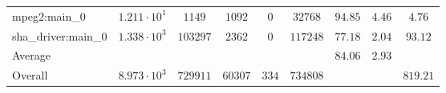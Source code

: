 \begin{tabular}{|l|c|c|c|c|c|c|c|c|}
mpeg2:main\_0           & $ 1.211 \cdot 10^{1} $ & $ 1149   $ & $ 1092  $ & $ 0   $ & $ 32768  $ & $ 94.85       $ & $ 4.46    $ & $ 4.76    $ \\
sha\_driver:main\_0     & $ 1.338 \cdot 10^{3} $ & $ 103297 $ & $ 2362  $ & $ 0   $ & $ 117248 $ & $ 77.18       $ & $ 2.04    $ & $ 93.12   $ \\
\hline
Average                 & $                    $ & $        $ & $       $ & $     $ & $        $ & $ 84.06       $ & $ 2.93    $ & $         $ \\
\hline
Overall                 & $ 8.973 \cdot 10^{3} $ & $ 729911 $ & $ 60307 $ & $ 334 $ & $ 734808 $ & $             $ & $         $ & $ 819.21  $ \\
\hline
\end{tabular}
